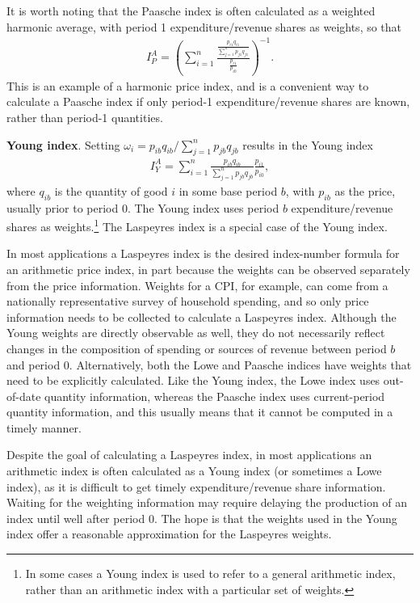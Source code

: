 \documentclass[]{article}
\begin{document}
It is worth noting that the Paasche index is often calculated as a weighted harmonic average, with period 1 expenditure/revenue shares as weights, so that
\begin{align*}
I^{A}_{P} = \left(\sum_{i = 1}^{n} \frac{\frac{p_{i1} q_{i1}}{\sum_{j = 1}^{n} p_{j1} q_{j1}}}{\frac{p_{i1}}{p_{i0}}}\right)^{-1}.
\end{align*}
This is an example of a harmonic price index, and is a convenient way to calculate a Paasche index if only period-1 expenditure/revenue shares are known, rather than period-1 quantities.

\textbf{Young index}. Setting \(\omega_{i} = p_{ib} q_{ib} / \sum_{j = 1}^{n} p_{jb} q_{jb}\) results in the Young index
\begin{align*}
I^{A}_{Y} = \sum_{i = 1}^{n} \frac{p_{ib} q_{ib}}{\sum_{j = 1}^{n} p_{jb} q_{jb}} \frac{p_{i1}}{p_{i0}},
\end{align*}
where \(q_{ib}\) is the quantity of good \(i\) in some base period \(b\), with \(p_{ib}\) as the price, usually prior to period 0. The Young index uses period \(b\) expenditure/revenue shares as weights.\footnote{In some cases a Young index is used to refer to a general arithmetic index, rather than an arithmetic index with a particular set of weights.} The Laspeyres index is a special case of the Young index.

In most applications a Laspeyres index is the desired index-number formula for an arithmetic price index, in part because the weights can be observed separately from the price information. Weights for a CPI, for example, can come from a nationally representative survey of household spending, and so only price information needs to be collected to calculate a Laspeyres index. Although the Young weights are directly observable as well, they do not necessarily reflect changes in the composition of spending or sources of revenue between period \(b\) and period 0. Alternatively, both the Lowe and Paasche indices have weights that need to be explicitly calculated. Like the Young index, the Lowe index uses out-of-date quantity information, whereas the Paasche index uses current-period quantity information, and this usually means that it cannot be computed in a timely manner.

Despite the goal of calculating a Laspeyres index, in most applications an arithmetic index is often calculated as a Young index (or sometimes a Lowe index), as it is difficult to get timely expenditure/revenue share information. Waiting for the weighting information may require delaying the production of an index until well after period 0. The hope is that the weights used in the Young index offer a reasonable approximation for the Laspeyres weights.
\end{document}

